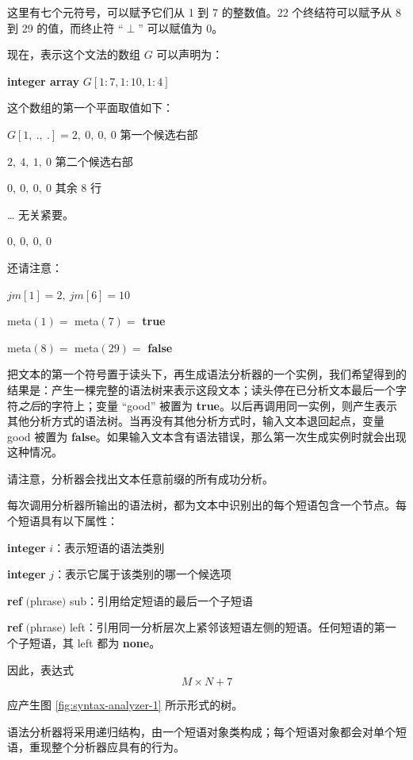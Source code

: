 \documentclass[twoside,11pt,fontset=none]{ctexbook}
\begin{document}
\noindent
这里有七个元符号，可以赋予它们从 1 到 7 的整数值。22 个终结符可以赋予从 8 到 29 的值，而终止符 ``$\perp$'' 可以赋值为 0。

现在，表示这个文法的数组 $G$ 可以声明为：

\quad \textbf{integer array} $G[1:7, 1:10, 1:4]$

\noindent
这个数组的第一个平面取值如下：

\quad $G[1,\ .,\ .] = 2,\ 0,\ 0,\ 0$\tabto*{12em} 第一个候选右部

\tabto*{7.4em}$2,\ 4,\ 1,\ 0$\tabto*{12em} 第二个候选右部

\tabto*{7.4em}$0,\ 0,\ 0,\ 0$\tabto*{12em} 其余 8 行

\tabto*{7.4em}\quad\dots\tabto*{12em} 无关紧要。

\tabto*{7.4em}$0,\ 0,\ 0,\ 0$

\noindent
还请注意：

\quad $jm[1] = 2,\ jm[6] = 10$

\quad meta$(1) =$ meta$(7) =$ \textbf{true}

\quad meta$(8) =$ meta$(29) =$ \textbf{false}

把文本的第一个符号置于读头下，再生成语法分析器的一个实例，我们希望得到的结果是：产生一棵完整的语法树来表示这段文本；读头停在已分析文本最后一个字符\textit{之后}的字符上；变量 ``good'' 被置为 \textbf{true}。以后再调用同一实例，则产生表示其他分析方式的语法树。当再没有其他分析方式时，输入文本退回起点，变量 good 被置为 \textbf{false}。如果输入文本含有语法错误，那么第一次生成实例时就会出现这种情况。

请注意，分析器会找出文本任意前缀的所有成功分析。

每次调用分析器所输出的语法树，都为文本中识别出的每个短语包含一个节点。每个短语具有以下属性：

\quad \textbf{integer} $i$：表示短语的语法类别

\quad \textbf{integer} $j$：表示它属于该类别的哪一个候选项

\quad \textbf{ref} $($phrase$)$ sub：引用给定短语的最后一个子短语

\parindent\quad \textbf{ref} $($phrase$)$ left：引用同一分析层次上紧邻该短语左侧的短语。任何短语的第一个子短语，其 left 都为 \textbf{none}。

\noindent
因此，表达式
$$
M\times N + 7
$$

\noindent
应产生图 \ref{fig:syntax-analyzer-1} 所示形式的树。

语法分析器将采用递归结构，由一个短语对象类构成；每个短语对象都会对单个短语，重现整个分析器应具有的行为。
\end{document}
